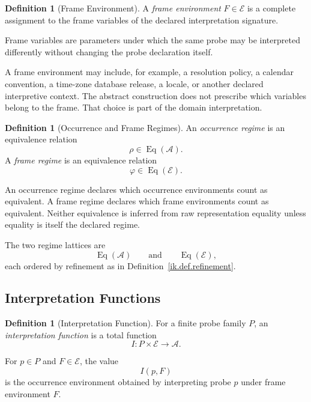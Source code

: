 \documentclass[11pt]{article}
\theoremstyle{plain}
\theoremstyle{definition}
\newtheorem{definition}[theorem]{Definition}
\theoremstyle{remark}
\begin{document}
\begin{definition}[Frame Environment]
  \label{ik.def.frame-environment}
  A \emph{frame environment}
  \(F\in\mathcal{E}\)
  is a complete assignment
  to the frame variables of the declared interpretation signature.

  Frame variables are parameters
  under which the same probe may be interpreted differently
  without changing the probe declaration itself.
\end{definition}

A frame environment may include,
for example,
a resolution policy,
a calendar convention,
a time-zone database release,
a locale,
or another declared interpretive context.
The abstract construction does not prescribe
which variables belong to the frame.
That choice is part of the domain interpretation.

\begin{definition}[Occurrence and Frame Regimes]
  \label{ik.def.regimes}
  An \emph{occurrence regime} is an equivalence relation
  \[
    \rho\in\operatorname{Eq}(\mathcal{A}).
  \]
  A \emph{frame regime} is an equivalence relation
  \[
    \varphi\in\operatorname{Eq}(\mathcal{E}).
  \]
\end{definition}

An occurrence regime declares
which occurrence environments count as equivalent.
A frame regime declares
which frame environments count as equivalent.
Neither equivalence is inferred from raw representation equality
unless equality is itself the declared regime.

The two regime lattices are
\[
  \operatorname{Eq}(\mathcal{A})
  \qquad\text{and}\qquad
  \operatorname{Eq}(\mathcal{E}),
\]
each ordered by refinement as in Definition~\ref{ik.def.refinement}.

\subsection{Interpretation Functions}

\begin{definition}[Interpretation Function]
  \label{ik.def.interpretation}
  For a finite probe family \(P\),
  an \emph{interpretation function} is a total function
  \[
    I:
    P\times\mathcal{E}
    \longrightarrow
    \mathcal{A}.
  \]

  For \(p\in P\) and \(F\in\mathcal{E}\),
  the value
  \[
    I(p,F)
  \]
  is the occurrence environment obtained
  by interpreting probe \(p\)
  under frame environment \(F\).
\end{definition}
\end{document}

